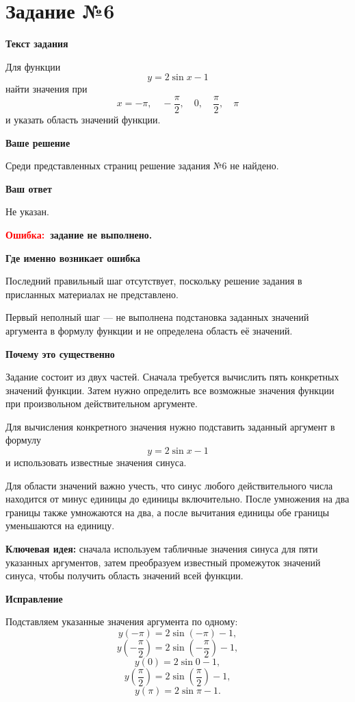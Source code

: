 \documentclass[12pt,a4paper]{article}
\newcommand{\err}{\textcolor{red}{Ошибка:}}
\newcommand{\idea}{\textcolor{blue!60!black}{Ключевая идея:}}
\begin{document}
\label{task:6}
\section*{Задание №6}

\textbf{Текст задания}

Для функции
\[
y=2\sin x-1
\]
найти значения при
\[
x=-\pi,\quad -\frac{\pi}{2},\quad 0,\quad \frac{\pi}{2},\quad \pi
\]
и указать область значений функции.

\textbf{Ваше решение}

Среди представленных страниц решение задания №6 не найдено.

\textbf{Ваш ответ}

Не указан.

\textbf{\err\ задание не выполнено.}

\textbf{Где именно возникает ошибка}

Последний правильный шаг отсутствует, поскольку решение задания в присланных материалах не представлено.

Первый неполный шаг --- не выполнена подстановка заданных значений аргумента в формулу функции и не определена область её значений.

\textbf{Почему это существенно}

Задание состоит из двух частей. Сначала требуется вычислить пять конкретных значений функции. Затем нужно определить все возможные значения функции при произвольном действительном аргументе.

Для вычисления конкретного значения нужно подставить заданный аргумент в формулу
\[
y=2\sin x-1
\]
и использовать известные значения синуса.

Для области значений важно учесть, что синус любого действительного числа находится от минус единицы до единицы включительно. После умножения на два границы также умножаются на два, а после вычитания единицы обе границы уменьшаются на единицу.

\textbf{\idea} сначала используем табличные значения синуса для пяти указанных аргументов, затем преобразуем известный промежуток значений синуса, чтобы получить область значений всей функции.

\textbf{Исправление}

Подставляем указанные значения аргумента по одному:
\[
y(-\pi)=2\sin(-\pi)-1,
\]
\[
y\left(-\frac{\pi}{2}\right)=2\sin\left(-\frac{\pi}{2}\right)-1,
\]
\[
y(0)=2\sin 0-1,
\]
\[
y\left(\frac{\pi}{2}\right)=2\sin\left(\frac{\pi}{2}\right)-1,
\]
\[
y(\pi)=2\sin\pi-1.
\]
\end{document}
